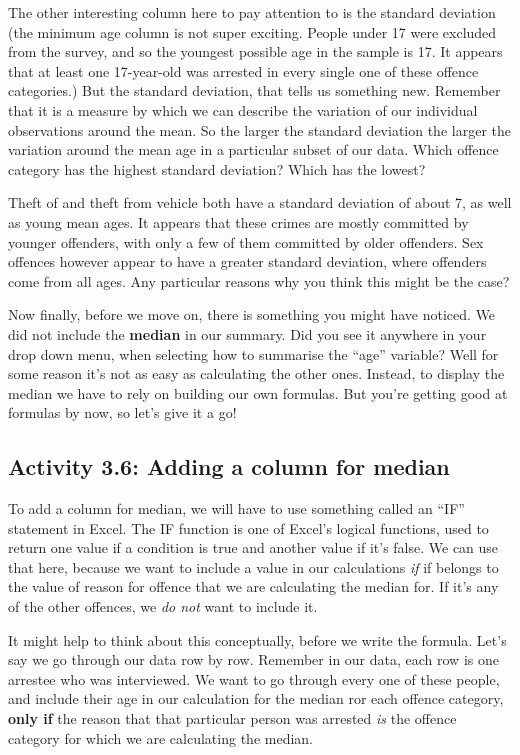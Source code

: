 \documentclass[
]{book}
\begin{document}
The other interesting column here to pay attention to is the standard deviation (the minimum age column is not super exciting. People under 17 were excluded from the survey, and so the youngest possible age in the sample is 17. It appears that at least one 17-year-old was arrested in every single one of these offence categories.) But the standard deviation, that tells us something new. Remember that it is a measure by which we can describe the variation of our individual observations around the mean. So the larger the standard deviation the larger the variation around the mean age in a particular subset of our data. Which offence category has the highest standard deviation? Which has the lowest?

Theft of and theft from vehicle both have a standard deviation of about 7, as well as young mean ages. It appears that these crimes are mostly committed by younger offenders, with only a few of them committed by older offenders. Sex offences however appear to have a greater standard deviation, where offenders come from all ages. Any particular reasons why you think this might be the case?

Now finally, before we move on, there is something you might have noticed. We did not include the \textbf{median} in our summary. Did you see it anywhere in your drop down menu, when selecting how to summarise the ``age'' variable? Well for some reason it's not as easy as calculating the other ones. Instead, to display the median we have to rely on building our own formulas. But you're getting good at formulas by now, so let's give it a go!

\hypertarget{activity-3.6-adding-a-column-for-median}{%
\subsection{Activity 3.6: Adding a column for median}\label{activity-3.6-adding-a-column-for-median}}

To add a column for median, we will have to use something called an ``IF'' statement in Excel. The IF function is one of Excel's logical functions, used to return one value if a condition is true and another value if it's false. We can use that here, because we want to include a value in our calculations \emph{if} if belongs to the value of reason for offence that we are calculating the median for. If it's any of the other offences, we \emph{do not} want to include it.

It might help to think about this conceptually, before we write the formula. Let's say we go through our data row by row. Remember in our data, each row is one arrestee who was interviewed. We want to go through every one of these people, and include their age in our calculation for the median ror each offence category, \textbf{only if} the reason that that particular person was arrested \emph{is} the offence category for which we are calculating the median.
\end{document}
